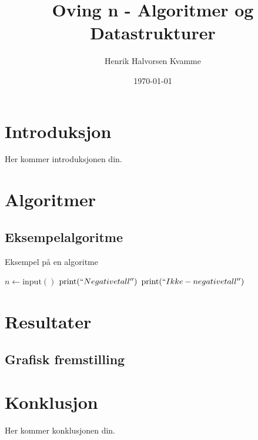 \documentclass[12pt,a4paper]{article}
\title{Oving n - Algoritmer og Datastrukturer}
\author{Henrik Halvorsen Kvamme}
\date{\today}
\begin{document}
\maketitle

\section{Introduksjon}
Her kommer introduksjonen din.

\section{Algoritmer}
\subsection{Eksempelalgoritme}
\begin{algorithm}
\caption{Eksempel på en algoritme}
\begin{algorithmic}
\STATE \( n \gets \text{input}() \)
\STATE \( \text{print}(``Negative tall'') \)
\ELSE
\STATE \( \text{print}(``Ikke-negative tall'') \)
\ENDIF
\end{algorithmic}
\end{algorithm}

\section{Resultater}
\subsection{Grafisk fremstilling}

\section{Konklusjon}
Her kommer konklusjonen din.
\end{document}
